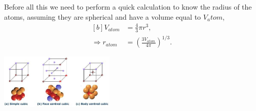 
\begin{questions}
\begin{solution}
Before all this we need to perform a quick calculation to know the radius of the atoms, assuming they are spherical and have a volume equal to $V_atom$,
\begin{equation}
  \begin{aligned}[b]
    V_{atom} &= \frac{4}{3}\pi r^3,\\
    \Rightarrow r_{atom} &= \left(\frac{3V_{atom}}{4\pi}\right)^{1/3}.
  \end{aligned}
  \label{radius}
\end{equation}


\begin{center}
  \includegraphics[width=55mm]{cells}\label{u:cells}
\end{center}

\vspace{0.5cm}


\end{solution}
\end{questions}
